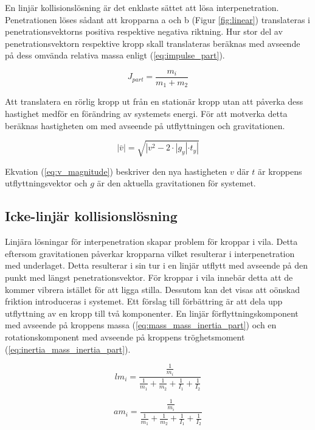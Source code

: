 \documentclass[a4paper,12pt,twopage,swedish]{article}
\begin{document}
En linjär kollisionslösning är det enklaste sättet att lösa interpenetration. Penetrationen löses sådant att kropparna a och b (Figur \ref{fig:linear}) translateras i penetrationsvektorns positiva respektive negativa riktning. Hur stor del av penetrationsvektorn respektive kropp skall translateras beräknas med avseende på dess omvända relativa massa enligt (\ref{eq:impulse_part}).

\begin{equation}\label{eq:impulse_part}
	J_{part} = \frac{m_i}{m_1+m_2}
\end{equation}

Att translatera en rörlig kropp ut från en stationär kropp utan att påverka dess hastighet medför en förändring av systemets energi. För att motverka detta beräknas hastigheten om med avseende på utflyttningen och gravitationen.

\begin{equation}\label{eq:v_magnitude}
	|\bar{v}| = \sqrt{|v^{2}-2\cdot|g_y| \cdot t_y|}
\end{equation}

Ekvation (\ref{eq:v_magnitude}) beskriver den nya hastigheten $v$ där $t$ är kroppens utflyttningsvektor och $g$ är den aktuella gravitationen för systemet.

\subsection{Icke-linjär kollisionslösning}
Linjära lösningar för interpenetration skapar problem för kroppar i vila. Detta eftersom gravitationen påverkar kropparna vilket resulterar i interpenetration med underlaget. Detta resulterar i sin tur i en linjär utflytt med avseende på den punkt med längst penetrationsvektor. För kroppar i vila innebär detta att de kommer vibrera istället för att ligga stilla. Dessutom kan det visas att oönskad friktion introduceras i systemet. Ett förslag till förbättring är att dela upp utflyttning av en kropp till två komponenter. En linjär förflyttningskomponent med avseende på kroppens massa (\ref{eq:mass_mass_inertia_part}) och en rotationskomponent med avseende på kroppens tröghetsmoment (\ref{eq:inertia_mass_inertia_part}).

\begin{equation}\label{eq:mass_mass_inertia_part}
	lm_i = \frac{\frac{1}{m_i}}{\frac{1}{m_1} + \frac{1}{m_2} + \frac{1}{I_1} + \frac{1}{I_2}}
\end{equation}

\begin{equation}\label{eq:inertia_mass_inertia_part}
 	am_i = \frac{\frac{1}{m_i}}{\frac{1}{m_1} + \frac{1}{m_2} + \frac{1}{I_1} + \frac{1}{I_2}}
\end{equation}
\end{document}
